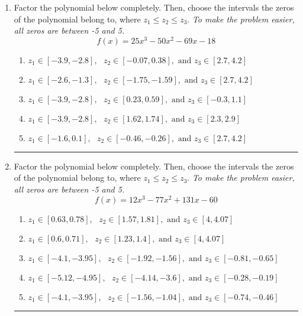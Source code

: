 \documentclass[14pt]{extbook}
\newcommand{\litem}[1]{\item#1\hspace*{-1cm}\rule{\textwidth}{0.4pt}}
\begin{document}
\begin{enumerate}
{\begin{enumerate}[label=\Alph*.]
\end{enumerate} }
\litem{
Factor the polynomial below completely. Then, choose the intervals the zeros of the polynomial belong to, where $z_1 \leq z_2 \leq z_3$. \textit{To make the problem easier, all zeros are between -5 and 5.}\[ f(x) = 25x^{3} -50 x^{2} -69 x -18 \]\begin{enumerate}[label=\Alph*.]
\item \( z_1 \in [-3.9, -2.8], \text{   }  z_2 \in [-0.07, 0.38], \text{   and   } z_3 \in [2.7, 4.2] \)
\item \( z_1 \in [-2.6, -1.3], \text{   }  z_2 \in [-1.75, -1.59], \text{   and   } z_3 \in [2.7, 4.2] \)
\item \( z_1 \in [-3.9, -2.8], \text{   }  z_2 \in [0.23, 0.59], \text{   and   } z_3 \in [-0.3, 1.1] \)
\item \( z_1 \in [-3.9, -2.8], \text{   }  z_2 \in [1.62, 1.74], \text{   and   } z_3 \in [2.3, 2.9] \)
\item \( z_1 \in [-1.6, 0.1], \text{   }  z_2 \in [-0.46, -0.26], \text{   and   } z_3 \in [2.7, 4.2] \)

\end{enumerate} }
\litem{
Factor the polynomial below completely. Then, choose the intervals the zeros of the polynomial belong to, where $z_1 \leq z_2 \leq z_3$. \textit{To make the problem easier, all zeros are between -5 and 5.}\[ f(x) = 12x^{3} -77 x^{2} +131 x -60 \]\begin{enumerate}[label=\Alph*.]
\item \( z_1 \in [0.63, 0.78], \text{   }  z_2 \in [1.57, 1.81], \text{   and   } z_3 \in [4, 4.07] \)
\item \( z_1 \in [0.6, 0.71], \text{   }  z_2 \in [1.23, 1.4], \text{   and   } z_3 \in [4, 4.07] \)
\item \( z_1 \in [-4.1, -3.95], \text{   }  z_2 \in [-1.92, -1.56], \text{   and   } z_3 \in [-0.81, -0.65] \)
\item \( z_1 \in [-5.12, -4.95], \text{   }  z_2 \in [-4.14, -3.6], \text{   and   } z_3 \in [-0.28, -0.19] \)
\item \( z_1 \in [-4.1, -3.95], \text{   }  z_2 \in [-1.56, -1.04], \text{   and   } z_3 \in [-0.74, -0.46] \)


\end{enumerate}}
\end{enumerate}
\end{document}
